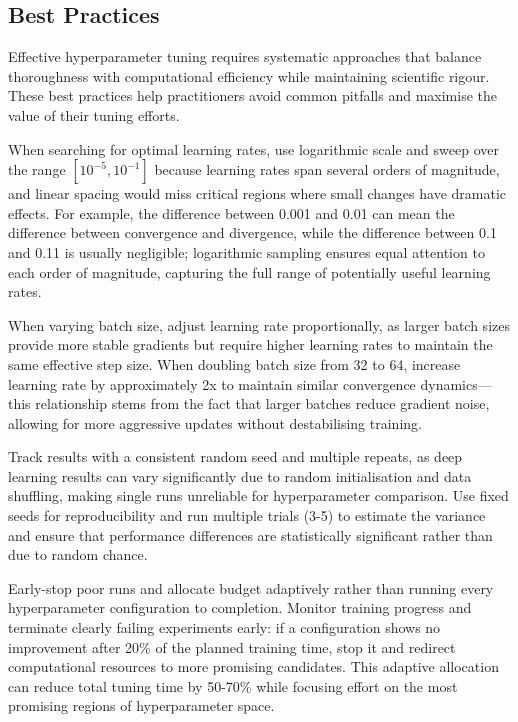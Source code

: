 \subsection{Best Practices}

Effective hyperparameter tuning requires systematic approaches that balance thoroughness with computational efficiency while maintaining scientific rigour. These best practices help practitioners avoid common pitfalls and maximise the value of their tuning efforts.

When searching for optimal learning rates, use logarithmic scale and sweep over the range $[10^{-5},10^{-1}]$ because learning rates span several orders of magnitude, and linear spacing would miss critical regions where small changes have dramatic effects. For example, the difference between 0.001 and 0.01 can mean the difference between convergence and divergence, while the difference between 0.1 and 0.11 is usually negligible; logarithmic sampling ensures equal attention to each order of magnitude, capturing the full range of potentially useful learning rates.

When varying batch size, adjust learning rate proportionally, as larger batch sizes provide more stable gradients but require higher learning rates to maintain the same effective step size. When doubling batch size from 32 to 64, increase learning rate by approximately 2x to maintain similar convergence dynamics—this relationship stems from the fact that larger batches reduce gradient noise, allowing for more aggressive updates without destabilising training.

Track results with a consistent random seed and multiple repeats, as deep learning results can vary significantly due to random initialisation and data shuffling, making single runs unreliable for hyperparameter comparison. Use fixed seeds for reproducibility and run multiple trials (3-5) to estimate the variance and ensure that performance differences are statistically significant rather than due to random chance.

Early-stop poor runs and allocate budget adaptively rather than running every hyperparameter configuration to completion. Monitor training progress and terminate clearly failing experiments early: if a configuration shows no improvement after 20\% of the planned training time, stop it and redirect computational resources to more promising candidates. This adaptive allocation can reduce total tuning time by 50-70\% while focusing effort on the most promising regions of hyperparameter space.


